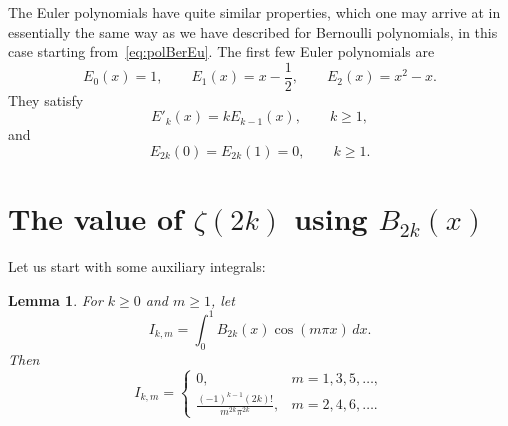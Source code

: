 \documentclass[11pt, oneside]{article}
\theoremstyle{plain}
\newtheorem{lemma}[theorem]{Lemma}
\theoremstyle{definition}
\begin{document}
The Euler polynomials have quite similar properties, which one may arrive at in essentially the same way as we have described for Bernoulli polynomials, in this case starting from~\eqref{eq:polBerEu}. The first few Euler polynomials are
\[
  E_0(x) = 1,
  \qquad
  E_1(x) = x - \frac{1}{2},
  \qquad
  E_2(x) = x^2 - x.
\]
They satisfy
\begin{equation}
\label{eq:derivEuler}
  E'_k(x) = k E_{k-1}(x),
  \qquad k\geq 1,
\end{equation}
and
\begin{equation*}
  E_{2k}(0) = E_{2k}(1) = 0,
  \qquad k\geq 1.
\end{equation*}


\section{The value of $\zeta(2k)$ using $B_{2k}(x)$}
\label{sec:sumB}

Let us start with some auxiliary integrals:

\begin{lemma}
\label{lem:Ikm}
For $k \ge 0$ and $m \ge 1$, let
\[
  I_{k,m} = \int_0^{1} B_{2k}(x) \cos(m\pi x)\,dx.
\]
Then
\begin{equation}
\label{eq:evalInt}
  I_{k,m} = 
  \begin{cases}
  0, & m=1,3,5,\dots, \\
  \displaystyle \frac{(-1)^{k-1}(2k)!}{m^{2k} \pi^{2k}}, & m=2,4,6,\dots.
  \end{cases}
\end{equation}
\end{lemma}
\end{document}
